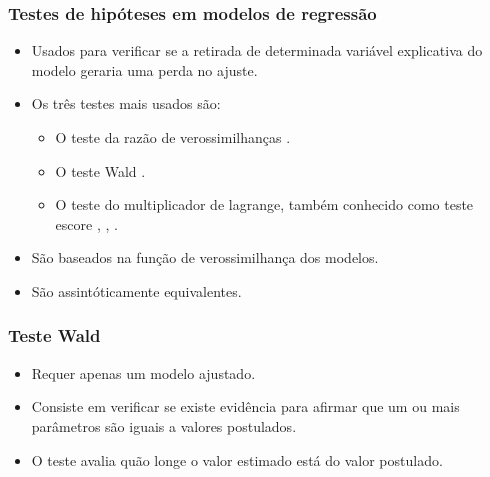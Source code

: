 \documentclass[10pt,
  aspectratio=169,
  serif,
  mathserif,
  professionalfont,
  compress,
  handout,
  ]{beamer}\usepackage[]{graphicx}\usepackage[]{color}
\begin{document}

\begin{frame}
  \frametitle{Testes de hipóteses em modelos de regressão}
  \begin{itemize}
    \itemsep 2ex
  
  \item Usados para verificar se a retirada de determinada variável explicativa do modelo geraria uma perda no ajuste.
  
  \item Os três testes mais usados são:

    \begin{itemize}
      \item O teste da razão de verossimilhanças \cite{trv}.
      \item O teste Wald \cite{wald}.
      \item O teste do multiplicador de lagrange, também conhecido como teste escore \cite{score1}, \cite{score2}, \cite{score3}.
    \end{itemize}
  
  \item São baseados na função de verossimilhança dos modelos.
  
  \item São assintóticamente equivalentes.
  
  \end{itemize}
  
\end{frame}


\begin{frame}
  \frametitle{Teste Wald}

  \begin{itemize}
    \itemsep 2ex

  \item Requer apenas um modelo ajustado. 
  
  \item Consiste em verificar se existe evidência para afirmar que um ou mais parâmetros são iguais a valores postulados. 

  \item O teste avalia quão longe o valor estimado está do valor postulado. 

  \end{itemize}

\end{frame}
\end{document}

